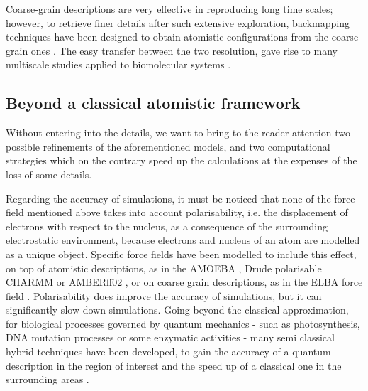 \documentclass[graybox]{svmult}
\begin{document}
 Coarse-grain descriptions are very effective in reproducing long time scales; however, to retrieve finer details after such extensive exploration, backmapping techniques have been designed to obtain atomistic configurations from the coarse-grain ones \cite{Wassenaar2015}. The easy transfer between the two resolution, gave rise to many multiscale studies applied to biomolecular systems \cite{Lee2012}.


\subsection{Beyond a classical atomistic framework} 

Without entering into the details, we want to bring to the reader attention two possible refinements of the aforementioned models, and two computational strategies which on the contrary speed up the calculations at the expenses of the loss of some details.

Regarding the accuracy of simulations, it must be noticed that none of the force field mentioned above takes into account polarisability, i.e. the displacement of electrons with respect to the nucleus, as a consequence of the surrounding electrostatic environment, because electrons and nucleus of an atom are modelled as a unique object. Specific force fields have been modelled to include this effect, on top of atomistic descriptions, as in the AMOEBA \cite{Ren2003,Ponder2010}, Drude polarisable CHARMM \cite{Anisimov2004} or AMBERff02 \cite{Cieplak2001}, or on coarse grain descriptions, as in the ELBA force field \cite{Orsi2011}. Polarisability does improve the accuracy of simulations, but it can significantly slow down simulations.
%
Going beyond the classical approximation, for biological processes governed by quantum mechanics - such as photosynthesis, DNA mutation processes or some enzymatic activities - many semi classical hybrid techniques have been developed, to gain the accuracy of a quantum description in the region of interest and the speed up of a classical one in the surrounding areas \cite{Ahmadi2018}. 
\end{document}
